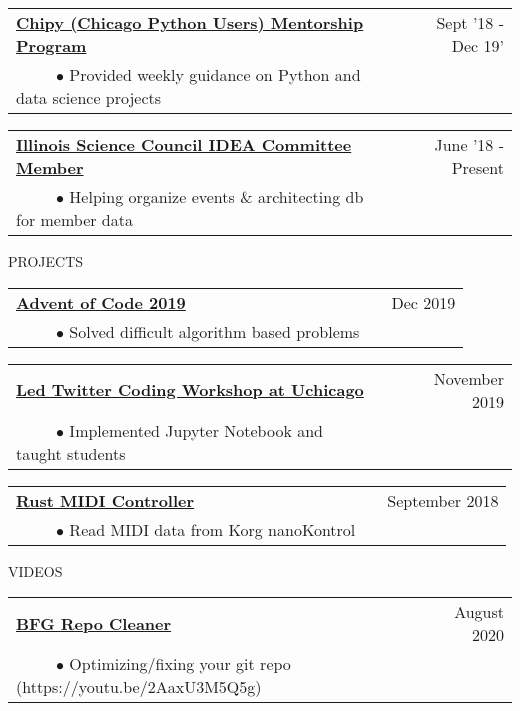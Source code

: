 \documentclass[11pt]{article}
\begin{document}
\begin{tabularx}{\linewidth}{l X r}
\textbf{\href{https://chipymentor.org/}{Chipy (Chicago Python Users) Mentorship Program}} & & Sept '18 - Dec 19' \\
~~~~~$\bullet$ Provided weekly guidance on Python and data science projects\\
\end{tabularx}


\begin{tabularx}{\linewidth}{l X r}
\textbf{\href{http://www.illinoisscience.org/about-2/associates-board/}{Illinois Science Council IDEA Committee Member}} & & June '18 - Present \\
~~~~~$\bullet$ Helping organize events \& architecting db for member data\\
\end{tabularx}


\vspace {.8cm}


{PROJECTS}
\vspace {0.4cm}

\begin{tabularx}{\linewidth}{l X r}
\textbf{\href{https://github.com/silverdrake11/advent_of_code_2019_kevin}{Advent of Code 2019}} & & Dec 2019  \\
~~~~~$\bullet$ Solved difficult algorithm based problems\\
\end{tabularx}

\begin{tabularx}{\linewidth}{l X r}
\textbf{\href{https://github.com/silverdrake11/twitter_uchicago_workshop}{Led Twitter Coding Workshop at Uchicago}} & & November 2019 \\
~~~~~$\bullet$ Implemented Jupyter Notebook and taught students\\
\end{tabularx}

\begin{tabularx}{\linewidth}{l X r}
\textbf{\href{https://github.com/silverdrake11/rustkontrol/blob/master/src/main.rs}{Rust MIDI Controller}} & & September 2018 \\
~~~~~$\bullet$ Read MIDI data from Korg nanoKontrol\\
\end{tabularx}




\vspace {.8cm}

{VIDEOS}
\vspace {0.4cm}


\begin{tabularx}{\linewidth}{l X r}
\textbf{\href{https://www.youtube.com/watch?v=2AaxU3M5Q5g\&t=1903s}{BFG Repo Cleaner}} & & August 2020 \\
~~~~~$\bullet$ Optimizing/fixing your git repo (https://youtu.be/2AaxU3M5Q5g)\\
\end{tabularx}
\end{document}
